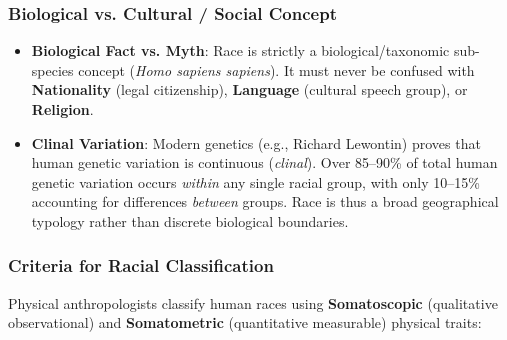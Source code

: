 \documentclass[11pt,a4paper]{article}
\begin{document}
\subsubsection{Biological vs. Cultural / Social Concept}
\begin{itemize}[leftmargin=*]
  \item \textbf{Biological Fact vs. Myth}: Race is strictly a biological/taxonomic sub-species concept (\textit{Homo sapiens sapiens}). It must never be confused with \textbf{Nationality} (legal citizenship), \textbf{Language} (cultural speech group), or \textbf{Religion}.
  \item \textbf{Clinal Variation}: Modern genetics (e.g., Richard Lewontin) proves that human genetic variation is continuous (\textit{clinal}). Over 85--90\% of total human genetic variation occurs \textit{within} any single racial group, with only 10--15\% accounting for differences \textit{between} groups. Race is thus a broad geographical typology rather than discrete biological boundaries.
\end{itemize}

\subsubsection{Criteria for Racial Classification}
Physical anthropologists classify human races using \textbf{Somatoscopic} (qualitative observational) and \textbf{Somatometric} (quantitative measurable) physical traits:
\end{document}
